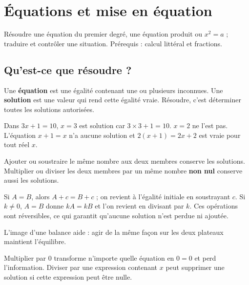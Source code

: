 \documentclass[../cours_3e.tex]{subfiles}
\begin{document}
\setcounter{chapter}{5}
\chapter{Équations et mise en équation}
\label{ch:equations}
\begin{objectif}
Résoudre une équation du premier degré, une équation produit ou $x^2=a$ ; traduire et contrôler une situation. Prérequis : calcul littéral et fractions.
\end{objectif}
\section{Qu'est-ce que résoudre ?}
\begin{definition}
Une \textbf{équation} est une égalité contenant une ou plusieurs inconnues. Une \textbf{solution} est une valeur qui rend cette égalité vraie. Résoudre, c'est déterminer toutes les solutions autorisées.
\end{definition}
Dans $3x+1=10$, $x=3$ est solution car $3\times3+1=10$. $x=2$ ne l'est pas. L'équation $x+1=x$ n'a aucune solution et $2(x+1)=2x+2$ est vraie pour tout réel $x$.
\begin{propriete}
Ajouter ou soustraire le même nombre aux deux membres conserve les solutions. Multiplier ou diviser les deux membres par un même nombre \textbf{non nul} conserve aussi les solutions.
\end{propriete}
\begin{demonstration}
Si $A=B$, alors $A+c=B+c$ ; on revient à l'égalité initiale en soustrayant $c$. Si $k\ne0$, $A=B$ donne $kA=kB$ et l'on revient en divisant par $k$. Ces opérations sont réversibles, ce qui garantit qu'aucune solution n'est perdue ni ajoutée.
\end{demonstration}
L'image d'une balance aide : agir de la même façon sur les deux plateaux maintient l'équilibre.
\begin{attention}
Multiplier par $0$ transforme n'importe quelle équation en $0=0$ et perd l'information. Diviser par une expression contenant $x$ peut supprimer une solution si cette expression peut être nulle.
\end{attention}
\end{document}
